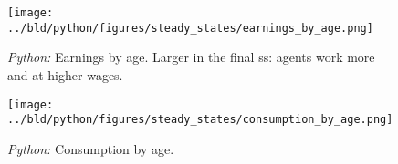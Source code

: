 \documentclass[11pt, a4paper, leqno]{article}
\begin{document}
\begin{figure}

    \centering
    \texttt{[image: ../bld/python/figures/steady\_states/earnings\_by\_age.png]}
    \caption{\emph{Python:} Earnings by age. Larger in the final ss: agents work more and at higher wages.}
    \label{fig:python-E}

\end{figure}


\begin{figure}

    \centering
    \texttt{[image: ../bld/python/figures/steady\_states/consumption\_by\_age.png]}
    \caption{\emph{Python:} Consumption by age.}
    \label{fig:python-C}

\end{figure}

\printbibliography
\end{document}
